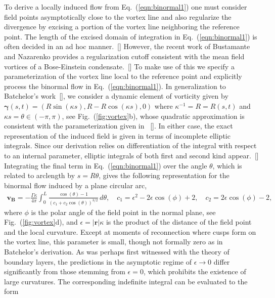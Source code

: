 \documentclass[aps,graphicx,reprint,onecolumn,12pt,tightenlines,longbibliography]{revtex4-1}
\newcommand{\sas}[2]{{#2}}
\begin{document}
To derive a locally induced flow from Eq.~(\ref{eqn:binormal1}) one must consider field points asymptotically close to the vortex line and also regularize the divergence by excising a portion of the vortex line neighboring the reference point. The length of the excised domain of integration in Eq.~(\ref{eqn:binormal1}) is often decided in an ad hoc manner.~[]  However, the recent work of Bustamante and Nazarenko provides a regularization cutoff consistent with the mean field vortices of a Bose-Einstein condensate.~[] To make use of this we specify a parameterization of the vortex line local to the reference point and explicitly  process the binormal flow in Eq.~(\ref{eqn:binormal1}).  In generalization to Batchelor's work~[], we consider a dynamic element of vorticity given by $\bm{\gamma}(s,t) = (R \sin(\kappa s), R - R \cos(\kappa s),0)$ where $\kappa^{-1} = R=R(s,t)$ and $\kappa s= \theta \in (-\pi,\pi)$, see Fig.~(\ref{fig:vortex}b), whose quadratic approximation is consistent with the parameterization given in ~[]. In either case, the  exact representation of the induced field is given in terms of incomplete elliptic integrals. Since our derivation relies on differentiation of the integral with respect to an internal parameter, elliptic integrals of both first and second kind appear.~[] Integrating the final term in Eq.~(\ref{eqn:binormal1}) over the angle $\theta$\sas{}{,} which is related to arclength by $s=R\theta$, gives the following representation for the binormal flow induced by a plane circular arc, 
%
\begin{align}\label{eqn:binormal2}
\bm{v}_{\textbf{B}} = -\frac{\Gamma \kappa}{4\pi} \int_{0}^{L} \frac{\cos(\theta) - 1}{(c_{1} + c_{2} \cos(\theta))^{3/2}} \, d\theta, \quad c_{1} = \epsilon^{2}  -2 \epsilon \cos(\phi)+2, \quad c_{2} = 2\epsilon \cos(\phi)-2,
\end{align}
%
where $\phi$ is the polar angle of the field point in the normal plane, see Fig.~(\ref{fig:vortex}d), and $\epsilon = |\bm{r}| \kappa$ is the product of the distance of the field point and the local curvature. Except at moments of reconnection where cusps form on the vortex line, this parameter is small, though not formally zero as in Batchelor's derivation. As was perhaps first witnessed with the theory of boundary layers, the predictions in the asymptotic regime of $\epsilon \to 0$ differ significantly from those stemming from $\epsilon=0$, which prohibits the existence of large curvatures. The corresponding indefinite integral can be evaluated to the form
\end{document}

